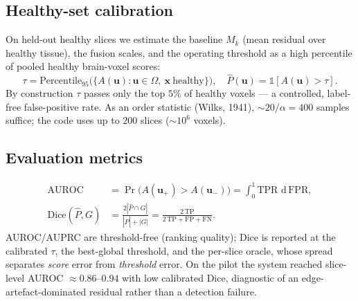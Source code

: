 \documentclass[12pt,a4paper]{article}
\theoremstyle{definition}
\theoremstyle{plain}
\newcommand{\x}{\bm{x}}
\newcommand{\dd}{\,\mathrm{d}}
\begin{document}
\subsection{Healthy-set calibration}
\label{sec:calib}
On held-out healthy slices we estimate the baseline $M_k$ (mean residual over
healthy tissue), the fusion scales, and the operating threshold as a high
percentile of pooled healthy brain-voxel scores:
\begin{equation}
\tau=\mathrm{Percentile}_{95}\big(\{A(\bm u):\bm u\in\Omega,\ \x\ \text{healthy}\}\big),
\quad \hat P(\bm u)=\mathbb 1[A(\bm u)>\tau].
\end{equation}
By construction $\tau$ passes only the top $5\%$ of healthy voxels --- a controlled,
label-free false-positive rate. As an order statistic (Wilks, 1941),
$\sim\!20/\alpha=400$ samples suffice; the code uses up to $200$ slices
($\sim\!10^6$ voxels).

\subsection{Evaluation metrics}
\begin{align}
\mathrm{AUROC}&=\Pr\big(A(\bm u_+)>A(\bm u_-)\big)=\int_0^1\!\mathrm{TPR}\,\dd\,\mathrm{FPR},\\
\mathrm{Dice}(\hat P,G)&=\frac{2|\hat P\cap G|}{|\hat P|+|G|}
=\frac{2\,\mathrm{TP}}{2\,\mathrm{TP}+\mathrm{FP}+\mathrm{FN}}.
\end{align}
AUROC/AUPRC are threshold-free (ranking quality); Dice is reported at the
calibrated $\tau$, the best-global threshold, and the per-slice oracle, whose
spread separates \emph{score} error from \emph{threshold} error. On the pilot the
system reached slice-level AUROC $\approx0.86\text{--}0.94$ with low calibrated
Dice, diagnostic of an edge-artefact-dominated residual rather than a detection
failure.

\end{document}
